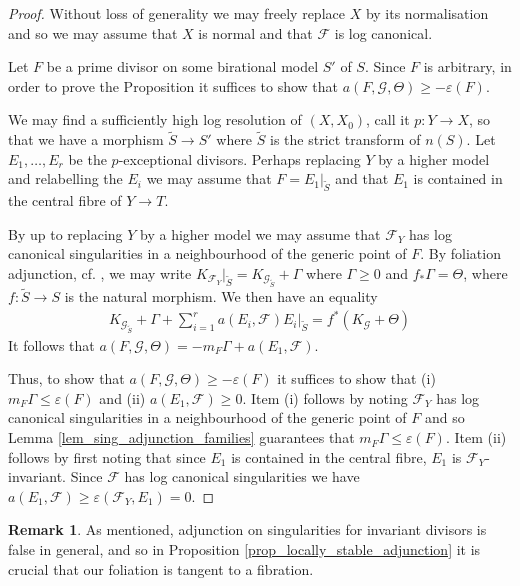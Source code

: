 \documentclass[12pt, a4paper]{amsart}
\theoremstyle{definition}
\newtheorem{remark}[theorem]{Remark}
\theoremstyle{named}
\begin{document}
\begin{proof}
Without loss of generality we may freely replace $X$ by its normalisation and so we may assume that $X$ is normal and that $\mathcal F$ is log canonical.


Let $F$ be a prime divisor on some birational model $S'$ of $S$.  Since $F$ is arbitrary, in order to prove the Proposition it suffices to show that 
$a(F, \mathcal G, \Theta) \ge -\varepsilon(F)$.  

We may find a sufficiently high log resolution of $(X, X_0)$, call it  $p\colon Y \rightarrow X$, so that we have a morphism 
$\tilde{S} \rightarrow S'$ where $\tilde{S}$
is the strict transform of $n(S)$.
Let $E_1, \dots, E_r$ be the $p$-exceptional divisors.
Perhaps replacing $Y$ by a higher model and relabelling the $E_i$ we may assume that 
$F = E_1 \vert_{\tilde{S}}$ and that $E_1$ is contained in the 
central fibre of $Y \rightarrow T$.

By \cite[III.iii.4]{MP13}
 up to replacing $Y$ by a higher model 
we may assume that $\mathcal F_Y$ has log canonical 
singularities in a neighbourhood of the generic point of $F$.
By foliation adjunction, cf. \cite[Proposition-Definition 3.12]{CS23b}, we may write $K_{\mathcal F_Y}\vert_{\tilde{S}} = 
K_{\mathcal G_{\tilde{S}}}+\Gamma$ where $\Gamma \ge 0$ and 
$f_*\Gamma = \Theta$, where $f\colon \tilde{S} \rightarrow S$
is the natural morphism.
We then have an equality \begin{align*}K_{\mathcal G_{\tilde{S}}}+\Gamma+\sum_{i = 1}^r a(E_i, \mathcal F)E_i\vert_{\tilde{S}} = f^*(K_{\mathcal G}+\Theta)\end{align*}
It follows that $a(F, \mathcal G, \Theta) = -m_F\Gamma+a(E_1, \mathcal F)$. 

Thus, to show that $a(F, \mathcal G, \Theta) \ge -\varepsilon(F)$ it suffices to show that 
(i) $m_F\Gamma \leq \varepsilon(F)$ and (ii) $a(E_1, \mathcal F) \ge 0$.  
 Item   (i) follows by noting $\mathcal F_Y$ has log canonical singularities in a 
neighbourhood of the generic point of $F$ and so
Lemma \ref{lem_sing_adjunction_families} 
guarantees that $m_F\Gamma \leq \varepsilon(F)$.
Item (ii) follows by first noting that since $E_1$ is contained in the central fibre, 
$E_1$ is $\mathcal F_Y$-invariant.  Since $\mathcal F$ has log canonical singularities we have
$a(E_1, \mathcal F) \ge \varepsilon(\mathcal F_Y, E_1) = 0$.
\end{proof}

\begin{remark}
    As mentioned, adjunction on singularities for invariant divisors 
is false in general, and so in Proposition \ref{prop_locally_stable_adjunction} it is crucial that our foliation is tangent to a fibration.
\end{remark}
\end{document}
